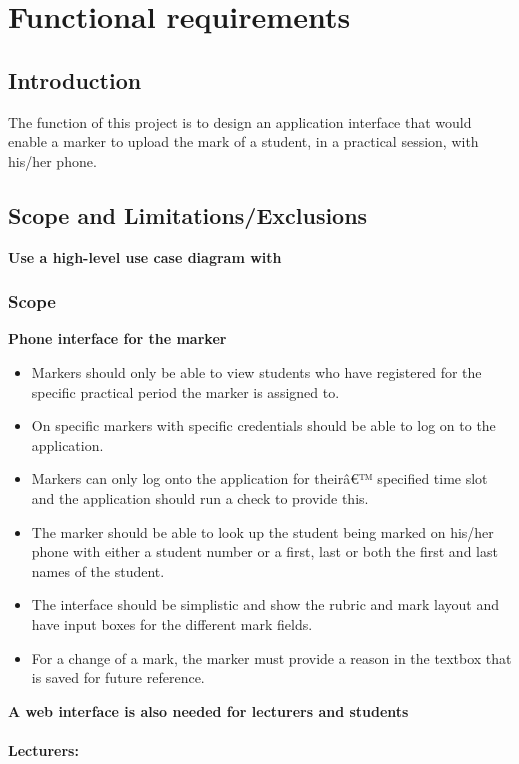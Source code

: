 \documentclass[11pt,a4paper]{article}
\begin{document}
\section{Functional requirements}
\subsection{Introduction}
The function of this project is to design an application interface that would enable a marker to upload the mark of a student, in a practical session, with his/her phone.
\subsection{Scope and Limitations/Exclusions}
\textbf {Use a high-level use case diagram with}\\
\subsubsection{Scope}
\textbf {Phone interface for the marker}

\begin{itemize}
\item Markers should only be able to view students who have registered for the specific practical period the marker is assigned to.
\item On specific markers with specific credentials should be able to log on to the application.
\item Markers can only log onto the application for theirâ€™ specified time slot and the application should run a check to provide this.
\item The marker should be able to look up the student being marked on his/her phone with either a student number or a first, last or both the first and last names of the student.
\item The interface should be simplistic and show the rubric and mark layout and have input boxes for the different mark fields.
\item For a change of a mark, the marker must provide a reason in the textbox that is saved for future reference.
\end{itemize}
\textbf{A web interface is also needed for lecturers and students}\\\\
\textbf{Lecturers:}
\end{document}

